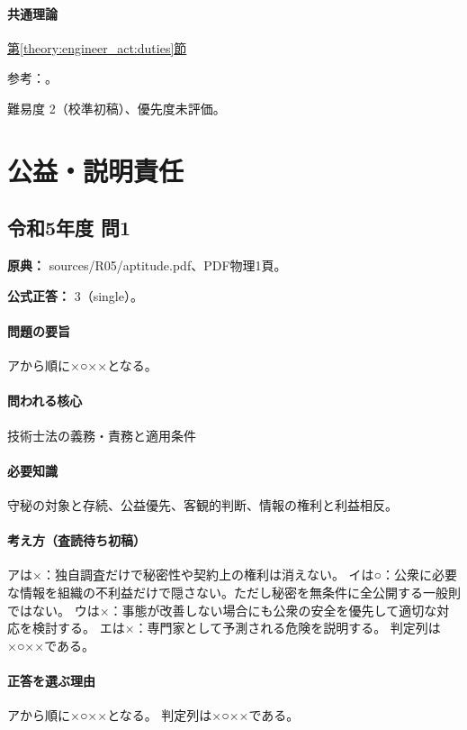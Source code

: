 \paragraph{共通理論} \hyperref[theory:engineer_act:duties]{第\ref*{theory:engineer_act:duties}節}

\par 参考：\cite{engineer_act_current}。

\par 難易度 2（校準初稿）、優先度未評価。

\section{公益・説明責任}

\subsection{令和5年度 問1}
\label{q:r05-reg-apt-01}

\noindent\textbf{原典：} sources/R05/aptitude.pdf、PDF物理1頁。

\textbf{公式正答：} 3（single）。

\paragraph{問題の要旨} アから順に×○××となる。

\paragraph{問われる核心} 技術士法の義務・責務と適用条件

\paragraph{必要知識} 守秘の対象と存続、公益優先、客観的判断、情報の権利と利益相反。

\paragraph{考え方（査読待ち初稿）} アは×：独自調査だけで秘密性や契約上の権利は消えない。 イは○：公衆に必要な情報を組織の不利益だけで隠さない。ただし秘密を無条件に全公開する一般則ではない。 ウは×：事態が改善しない場合にも公衆の安全を優先して適切な対応を検討する。 エは×：専門家として予測される危険を説明する。 判定列は×○××である。

\paragraph{正答を選ぶ理由} アから順に×○××となる。  判定列は×○××である。

